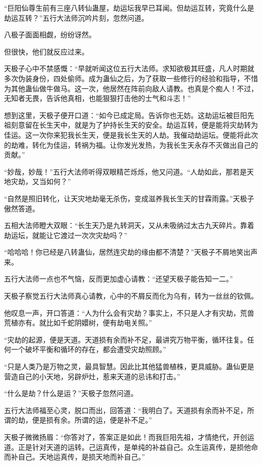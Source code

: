 \begin{this_body}
“巨阳仙尊生前有三座八转仙蛊屋，劫运坛我早已耳闻。但劫运互转，究竟什么是劫运互转？”五行大法师沉吟片刻，忽然问道。

八极子面面相觑，纷纷讶然。

但很快，他们就反应过来。

天极子心中不禁感慨：“早就听闻这位五行大法师。求知欲极其旺盛，凡人时期就多次伪装身份，四处偷师。成为蛊仙之后，为了获取一些修行的经验和指导，不惜为其他蛊仙做牛做马。这一次，他居然在阵前向敌人请教。也真是个痴人！不过，无知者无畏，告诉他真相，也能狠狠打击他的士气和斗志！”

想到这里，天极子便开口道：“如今已成定局。告诉你也无妨。这劫运坛被巨阳先祖刻意留在长生天中，就是为了护持长生天的安全。劫运互转，便是能将灾劫转为佳运。这一次你来犯我长生天，便是我长生天的人劫。我催动劫运坛。便能将此次的劫难，转化为佳运，转祸为福。让你发光发热，为我长生天永存不灭做出自己的贡献。”

“妙哉，妙哉！”五行大法师听得双眼精芒烁烁，他又问道。“人劫如此，那若是天地灾劫，又当如何？”

“自然是照旧转化，让天灾地劫毫无杀伤，变成滋养我长生天的甘霖雨露。”天极子傲然答道。

五相大法师瞪大双眼：“长生天乃是九转洞天，又从未吸纳过太古九天碎片。靠着劫运坛，就能让它渡过一次次灾劫吗？”

“哈哈哈！你已经是八转蛊仙，居然连灾劫的缘由都不清楚？”天极子不屑地笑出声来。

五行大法师一点也不气恼，反而更加虚心请教：“还望天极子能告知一二。”

天极子察觉五行大法师真心请教，心中的不屑反而化为乌有，转为一丝丝的钦佩。

他叹息一声，开口答道：“人为什么会有灾劫？事实上，不只是人才有灾劫，荒兽荒植亦有。就比如千蛇阴嬛树，便有劫电关照。”

“灾劫的起源，便是天道。天道损有余而补不足，最讲究万物平衡，循环往复。任何一个破坏平衡和循环的存在，都会遭受灾劫照顾。”

“只是人类乃是万物之灵，最具智慧。因此比其他猛兽植株，更具威胁。蛊仙更是营造自己的小天地，另辟炉灶，惹来天道的忌讳和打击。”

“什么是劫？什么是运？”天极子忽然问道。

五行大法师福至心灵，脱口而出，回答道：“我明白了。天道损有余而补不足，所谓的劫，便是损有余。所谓的运，便是补不足。”

天极子微微扬眉：“你答对了，答案正是如此！而我巨阳先祖，才情绝代，开创运道。正是针对天道的运转。己运真传，是单纯的补益自己。众生运真传，是损他命而补自己。天地运真传，是损天地而补自己。”


\end{this_body}
